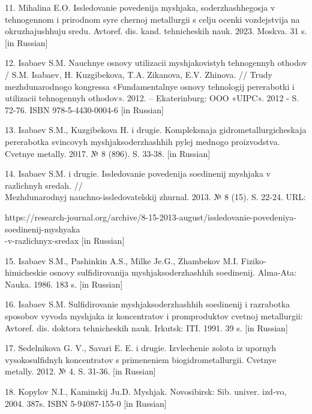 \begin{noparindent}
11. Mihalina E.O. Issledovanie povedenija mysh\textquotesingle jaka,
soderzhashhegosja v tehnogennom i prirodnom syr\textquotesingle e
chernoj metallurgii s cel\textquotesingle ju ocenki vozdejstvija na
okruzhajushhuju sredu. Avtoref. dis. kand. tehnicheskih nauk. 2023.
Moskva. 31 s. {[}in Russian{]}

12. Isabaev S.M. Nauchnye osnovy utilizacii
mysh\textquotesingle jakovistyh tehnogennyh othodov / S.M. Isabaev, H.
Kuzgibekova, T.A. Zikanova, E.V. Zhinova. // Trudy mezhdunarodnogo
kongressa «Fundamental\textquotesingle nye osnovy tehnologij pererabotki
i utilizacii tehnogennyh othodov». 2012. -- Ekaterinburg: OOO «UIPC».
2012 - S. 72-76. ISBN 978-5-4430-0004-6 {[}in Russian{]}

13. Isabaev S.M., Kuzgibekova H. i drugie. Kompleksnaja
gidrometallurgicheskaja pererabotka svincovyh
mysh\textquotesingle jaksoderzhashhih pylej mednogo proizvodstva.
Cvetnye metally. 2017. № 8 (896). S. 33-38. {[}in Russian{]}

14. Isabaev S.M. i drugie. Issledovanie povedenija soedinenij
mysh\textquotesingle jaka v razlichnyh sredah. // \\Mezhdunarodnyj
nauchno-issledovatel\textquotesingle skij zhurnal. 2013. № 8 (15). S.
22-24. URL:

https://research-journal.org/archive/8-15-2013-august/issledovanie-povedeniya-soedinenij-myshyaka\\-v-razlichnyx-sredax
{[}in Russian{]}

15. Isabaev S.M., Pashinkin A.S., Mil\textquotesingle ke Je.G.,
Zhambekov M.I. Fiziko-himicheskie osnovy
sul\textquotesingle fidirovanija mysh\textquotesingle jaksoderzhashhih
soedinenij. Alma-Ata: Nauka. 1986. 183 s. {[}in Russian{]}

16. Isabaev S.M. Sul\textquotesingle fidirovanie
mysh\textquotesingle jaksoderzhashhih soedinenij i razrabotka sposobov
vyvoda mysh\textquotesingle jaka iz koncentratov i promproduktov cvetnoj
metallurgii: Avtoref. dis. doktora tehnicheskih nauk. Irkutsk: ITI.
1991. 39 s. {[}in Russian{]}

17. Sedel\textquotesingle nikova G. V., Savari E. E. i drugie.
Izvlechenie zolota iz upornyh vysokosul\textquotesingle fidnyh
koncentratov s primeneniem biogidrometallurgii. Cvetnye metally. 2012. №
4. S. 31-36. {[}in Russian{]}

18. Kopylov N.I., Kaminskij Ju.D. Mysh\textquotesingle jak. Novosibirsk:
Sib. univer. izd-vo, 2004. 387s. ISBN 5-94087-155-0 {[}in Russian{]}


\end{noparindent}
